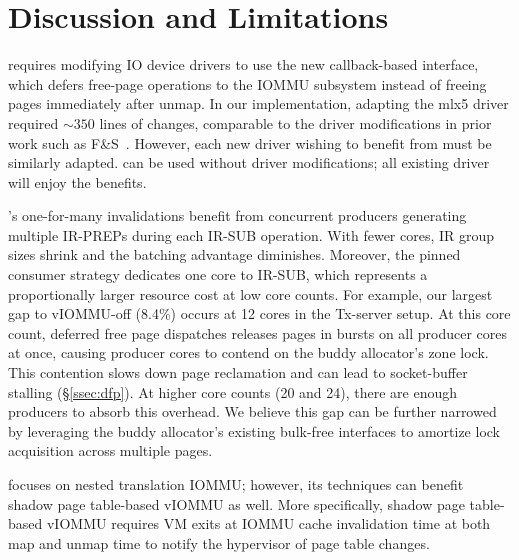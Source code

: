\section{Discussion and Limitations}

\brand requires modifying IO device drivers to use the new callback-based  interface,
    which defers free-page operations to the IOMMU subsystem
    instead of freeing pages immediately after unmap.
In our implementation, adapting the mlx5 driver required ${\sim}350$ lines of changes,
    comparable to the driver modifications in prior work such as F\&S~\cite{Rubin2024FastSafe}.
However, each new driver wishing to benefit from \brand must be similarly adapted.
\optOne{} can be used without driver modifications; all existing driver will enjoy the benefits.

\brand's one-for-many invalidations benefit from concurrent producers generating
    multiple IR-PREPs during each IR-SUB operation.
With fewer cores, IR group sizes shrink and the batching advantage diminishes.
Moreover, the pinned consumer strategy dedicates one core to IR-SUB,
    which represents a proportionally larger resource cost at low core counts.
For example, our largest gap to vIOMMU-off (8.4\%) occurs at 12 cores in the Tx-server setup.
At this core count, deferred free page dispatches releases pages in bursts
    on all producer cores at once,
    causing producer cores to contend on the buddy allocator's zone lock.
This contention slows down page reclamation and can lead to socket-buffer stalling (\S\ref{ssec:dfp}).
At higher core counts (20 and 24), there are enough producers to absorb this overhead.
We believe this gap can be further narrowed by leveraging the buddy allocator's
    existing bulk-free interfaces to amortize lock acquisition across multiple pages.

\uvmname{} focuses on nested translation IOMMU;
however, its techniques can benefit shadow page table-based vIOMMU as well.
More specifically, shadow page table-based vIOMMU requires VM exits at IOMMU cache invalidation time at both map and unmap time
to notify the hypervisor of page table changes.

